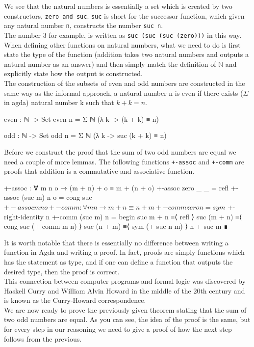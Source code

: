 \documentclass[11pt,a4paper]{article}
\begin{document}
We see that the natural numbers is essentially a set which is created by two constructors, \texttt{zero and suc}. \texttt{suc} is short for the successor function, which given any natural number \texttt{n}, constructs the number \texttt{suc n}. \\
The number 3 for example, is written as \texttt{suc (suc (suc (zero)))} in this way. When defining other functions on natural numbers, what we need to do is first state the type of the function (addition takes two natural numbers and outputs a natural number as an answer) and then simply match the definition of $\mathbb{N}$ and explicitly state how the output is constructed.\\
The construction of the subsets of even and odd numbers are constructed in the same way as the informal approach, a natural number n is even if there exists ($\Sigma$ in agda) natural number k such that $k + k = n$.
\begin{code}
even : ℕ -> Set
even n = Σ ℕ (λ k -> (k + k) ≡ n)
 
odd : ℕ -> Set
odd n = Σ ℕ (λ k -> suc (k + k) ≡ n)
\end{code}
Before we construct the proof that the sum of two odd numbers are equal we need a couple of more lemmas. The following functions \texttt{+-assoc} and \texttt{+-comm} are proofs that addition is a commutative and associative function. \\
\begin{code}
+-assoc : ∀ m n o → (m + n) + o ≡ m + (n + o)
+-assoc zero    _ _ = refl
+-assoc (suc m) n o = cong suc $ +-assoc m n o

+-comm : ∀ m n → m + n ≡ n + m
+-comm zero    n = sym $ +-right-identity n
+-comm (suc m) n =
  begin
    suc m + n
  ≡⟨ refl ⟩
    suc (m + n)
  ≡⟨ cong suc (+-comm m n) ⟩
    suc (n + m)
  ≡⟨ sym (+-suc n m) ⟩
    n + suc m
  ∎
\end{code}
It is worth notable that there is essentially no difference between writing a function in Agda and writing a proof. In fact, proofs are simply functions which has the statement as type, and if one can define a function that outputs the desired type, then the proof is correct.\\
This connection between computer programs and formal logic was discovered by Haskell Curry and William Alvin Howard in the middle of the 20th century and is known as the Curry-Howard correspondence.\\
We are now ready to prove the previously given theorem stating that the sum of two odd numbers are equal. As you can see, the idea of the proof is the same, but for every step in our reasoning we need to give a proof of how the next step follows from the previous.\\
\end{document}

